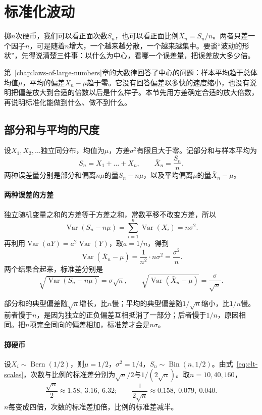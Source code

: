 \section{标准化波动}
\label{sec:clt-standardized}

掷$n$次硬币，我们可以看正面次数$S_n$，也可以看正面比例$\bar{X}_n=S_n/n$。两者只差一个因子$n$，可是随着$n$增大，一个越来越分散，一个越来越集中。要谈“波动的形状”，先得说清楚三件事：以什么为中心，看哪一个误差量，把误差放大多少倍。

第~\ref{chap:laws-of-large-numbers}章的大数律回答了中心的问题：样本平均趋于总体均值$\mu$，平均的偏差$\bar{X}_n-\mu$趋于零。它没有回答偏差以多快的速度缩小，也没有说明把偏差放大到合适的倍数以后是什么样子。本节先用方差确定合适的放大倍数，再说明标准化能做到什么、做不到什么。

\subsection{部分和与平均的尺度}
\label{sec:clt-scales}

设$X_1,X_2,\dots$独立同分布，均值为$\mu$，方差$\sigma^2$有限且大于零。记部分和与样本平均为
\[
 S_n=X_1+\dots+X_n,\qquad \bar{X}_n=\frac{S_n}{n} .
\]
两种误差量分别是部分和偏离$n\mu$的量$S_n-n\mu$，以及平均偏离$\mu$的量$\bar{X}_n-\mu$。

\paragraph{两种误差的方差}
独立随机变量之和的方差等于方差之和，常数平移不改变方差，所以
\[
 \operatorname{Var}(S_n-n\mu)=\sum_{i=1}^{n}\operatorname{Var}(X_i)=n\sigma^2 .
\]
再利用$\operatorname{Var}(aY)=a^2\operatorname{Var}(Y)$，取$a=1/n$，得到
\[
 \operatorname{Var}(\bar{X}_n-\mu)=\frac{1}{n^2}\cdot n\sigma^2=\frac{\sigma^2}{n} .
\]
两个结果合起来，标准差分别是
\begin{equation}
 \sqrt{\operatorname{Var}(S_n-n\mu)}=\sigma\sqrt{n},\qquad
 \sqrt{\operatorname{Var}(\bar{X}_n-\mu)}=\frac{\sigma}{\sqrt{n}} .
 \label{eq:clt-scales}
\end{equation}

部分和的典型偏差随$\sqrt{n}$增长，比$n$慢；平均的典型偏差随$1/\sqrt{n}$缩小，比$1/n$慢。前者慢于$n$，是因为独立的正负偏差互相抵消了一部分；后者慢于$1/n$，原因相同。把$n$项完全同向的偏差相加，标准差才会是$n\sigma$。

\paragraph{掷硬币}
设$X_i\sim\operatorname{Bern}(1/2)$，则$\mu=1/2$，$\sigma^2=1/4$，$S_n\sim\operatorname{Bin}(n,1/2)$。由式~\eqref{eq:clt-scales}，次数与比例的标准差分别为$\sqrt{n}/2$与$1/(2\sqrt{n})$。取$n=10,40,160$，
\[
 \frac{\sqrt{n}}{2}\approx1.58,\ 3.16,\ 6.32;\qquad \frac{1}{2\sqrt{n}}\approx0.158,\ 0.079,\ 0.040 .
\]
$n$每变成四倍，次数的标准差加倍，比例的标准差减半。

